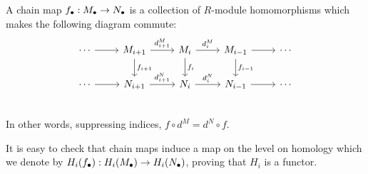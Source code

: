 \begin{definition}
    A chain map $f_\bullet: M_\bullet \to  N_\bullet$ is a collection of $R$-module homomorphisms which makes the following diagram commute:
    \[
        \begin{tikzcd}
            \cdots  \arrow[r, ""]&
            M_{i+1} \arrow[r, "d_{i+1}^{M}"] \arrow[d, "f_{i+1}"]&
            M_{i} \arrow[r, "d_{i}^{M}"] \arrow[d, "f_i"]&
            M_{i-1} \arrow[r, ""] \arrow[d, "f_{i-1}"]&
            \cdots \\
            \cdots  \arrow[r, ""]&
            N_{i+1} \arrow[r, "d_{i+1}^{N}"] &
            N_{i} \arrow[r, "d_{i}^{N}"] &
            N_{i-1} \arrow[r, ""] &
            \cdots \\
        \end{tikzcd}
    \]
    In other words, suppressing indices, $f  \circ  d^{M} = d^{N}  \circ f$.
\end{definition}

It is easy to check that chain maps induce a map on the level on homology which we denote by $H_i(f_\bullet): H_i(M_\bullet) \to  H_i(N_\bullet)$, proving that $H_i$ is a functor. 

